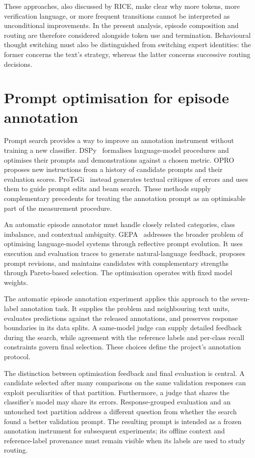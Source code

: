 \documentclass[12pt,a4paper,twoside,openright]{book}
\begin{document}
These approaches, also discussed by RICE, make clear why more tokens, more
verification language, or more frequent transitions cannot be interpreted as
unconditional improvements. In the present analysis, episode composition and
routing are therefore considered alongside token use and termination.
Behavioural thought switching must also be distinguished from switching
expert identities: the former concerns the text's strategy, whereas the
latter concerns successive routing decisions.

\section{Prompt optimisation for episode annotation}

Prompt search provides a way to improve an annotation instrument without
training a new classifier.
DSPy~\cite{khattab2024dspy} formalises language-model procedures and optimises
their prompts and demonstrations against a chosen metric.
OPRO~\cite{yang2024opro} proposes new instructions from a history of candidate
prompts and their evaluation scores.
ProTeGi~\cite{pryzant2023protegi} instead generates textual critiques of
errors and uses them to guide prompt edits and beam search.
These methods supply complementary precedents for treating the annotation
prompt as an optimisable part of the measurement procedure.

An automatic episode annotator must handle closely related categories,
class imbalance, and contextual ambiguity. GEPA~\cite{agrawal2026gepa}
addresses the broader problem of optimising language-model systems through
reflective prompt evolution. It uses execution and evaluation traces
to generate natural-language feedback, proposes prompt revisions, and
maintains candidates with complementary strengths through Pareto-based
selection. The optimisation operates with fixed model weights.

The automatic episode annotation experiment applies this approach to the
seven-label annotation task. It supplies the problem and neighbouring text
units, evaluates predictions against the released annotations, and preserves
response boundaries in its data splits. A same-model judge can supply detailed
feedback during the search, while agreement with the reference labels and
per-class recall constraints govern final selection. These choices define the
project's annotation protocol.

The distinction between optimisation feedback and final evaluation is
central. A candidate selected after many comparisons on the same validation
responses can exploit peculiarities of that partition. Furthermore, a judge
that shares the classifier's model may share its errors. Response-grouped
evaluation and an untouched test partition address a different question from
whether the search found a better validation prompt. The resulting prompt
is intended as a frozen annotation instrument for subsequent experiments;
its offline context and reference-label provenance must remain visible when
its labels are used to study routing.
\end{document}
